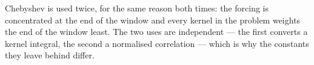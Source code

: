 \documentclass[11pt]{article}
\begin{document}
Chebyshev is used twice, for the same reason both times: the forcing is
concentrated at the end of the window and every kernel in the problem
weights the end of the window least. The two uses are independent ---
the first converts a kernel integral, the second a normalised
correlation --- which is why the constants they leave behind differ.
\end{document}
